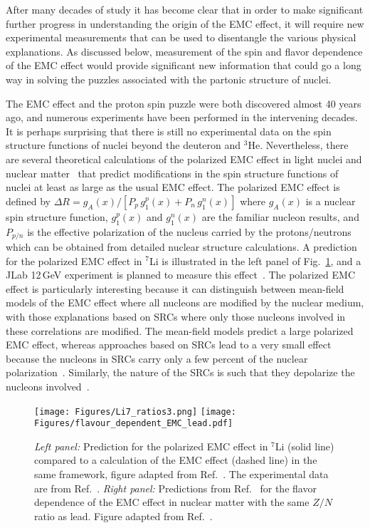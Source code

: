 After many decades of study it has become clear that in order to make significant further progress in understanding the origin of the EMC effect, it will require new experimental measurements that can be used to disentangle the various physical explanations. As discussed below, measurement of the spin and flavor dependence of the EMC effect would provide significant new information that could go a long way in solving the puzzles associated with the partonic structure of nuclei. 


The EMC effect and the proton spin puzzle were both discovered almost 40 years ago, and numerous experiments have been performed in the intervening decades. It is perhaps surprising that there is still no experimental data on the spin structure functions of nuclei beyond the deuteron and $^3$He. Nevertheless, there are several theoretical calculations of the polarized EMC effect in light nuclei and nuclear matter~\cite{Cloet:2005rt, Cloet:2006bq, Smith:2005ra, Tronchin:2018mvu} that predict modifications in the spin structure functions of nuclei at least as large as the usual EMC effect. The polarized EMC effect is defined by $\Delta R = g_A(x)/[P_p\,g_{1}^p(x) + P_n\,g_{1}^n(x)]$ where $g_A(x)$ is a nuclear spin structure function, $g_{1}^p(x)$ and $g_{1}^n(x)$ are %
the familiar nucleon results, and $P_{p/n}$ is the effective polarization of the nucleus carried by the protons/neutrons which can be obtained from detailed nuclear structure calculations. A prediction for the polarized EMC effect in $^7$Li is illustrated in the left panel of Fig.~\ref{fig:emc_effects}, and a JLab 12\,GeV experiment is planned to measure this effect~\cite{E12-14-001}. The polarized EMC effect is particularly interesting because it can distinguish between mean-field models of the EMC effect where all nucleons are modified by the nuclear medium, with those explanations based on SRCs where only those nucleons involved in these correlations are modified. The mean-field models predict a large polarized EMC effect, whereas approaches based on SRCs lead to a very small effect %
because the nucleons in SRCs carry only a few percent of the nuclear polarization~\cite{Pudliner:1995wk}. Similarly, the nature of the SRCs is such that they depolarize the nucleons involved~\cite{Thomas:2018kcx}.

\begin{figure}[tbp]
\centerline{
\texttt{[image: Figures/Li7\_ratios3.png]} \hfill
\texttt{[image: Figures/flavour\_dependent\_EMC\_lead.pdf]}}
\caption{{\it Left panel:} Prediction for the polarized EMC effect in $^7$Li (solid line) compared to a calculation of the EMC effect (dashed line) in the same framework, figure adapted from Ref.~\cite{Cloet:2006bq}. The experimental data are from Ref.~\cite{Gomez:1993ri}. {\it Right panel:}   Predictions from Ref.~\cite{Cloet:2012td} for the flavor dependence of the EMC effect in nuclear matter with the same $Z/N$ ratio as lead. Figure adapted from Ref.~\cite{Cloet:2012td}.}
\label{fig:emc_effects}
\end{figure}

